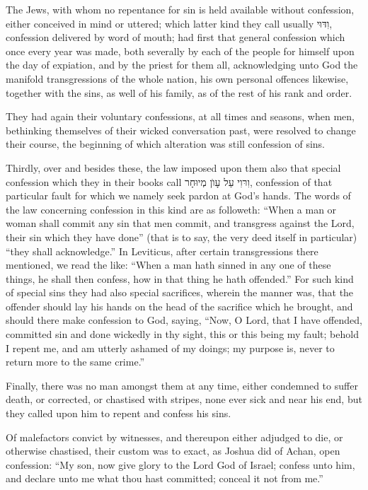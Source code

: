 The Jews, with whom no repentance for sin is held available without confession, either conceived in mind or uttered; which latter kind they call usually וִדּוּי, confession delivered by word of mouth; had first that general confession which once every year was made, both severally by each of the people for himself upon the day of expiation, and by the priest for them all, acknowledging unto God the manifold transgressions of the whole nation, his own personal offences likewise, together with the sins, as well of his family, as of the rest of his rank and order.

They had again their voluntary confessions, at all times and seasons, when men, bethinking themselves of their wicked conversation past, were resolved to change their course, the beginning of which alteration was still confession of sins.

Thirdly, over and besides these, the law imposed upon them also that special confession which they in their books call וִרּוִי עַל עָוׁן מְיוּחָר, confession of that particular fault for which we namely seek pardon at God’s hands. The words of the law concerning confession in this kind are as followeth: “When a man or woman shall commit any sin that men commit, and transgress against the Lord, their sin which they have done” (that is to say, the very deed itself in particular) “they shall acknowledge.” In Leviticus, after certain transgressions there mentioned, we read the like: “When a man hath sinned in any one of these things, he shall then confess, how in that thing he hath offended.” For such kind of special sins they had also special sacrifices, wherein the manner was, that the offender should lay his hands on the head of the sacrifice which he brought, and should there make confession to God, saying, “Now, O Lord, that I have offended, committed sin and done wickedly in thy sight, this or this being my fault; behold I repent me, and am utterly ashamed of my doings; my purpose is, never to return more to the same crime.”

Finally, there was no man amongst them at any time, either condemned to suffer death, or corrected, or chastised with stripes, none ever sick and near his end, but they called upon him to repent and confess his sins.

Of malefactors convict by witnesses, and thereupon either adjudged to die, or otherwise chastised, their custom was to exact, as Joshua did of Achan, open confession: “My son, now give glory to the Lord God of Israel; confess unto him, and declare unto me what thou hast committed; conceal it not from me.”

